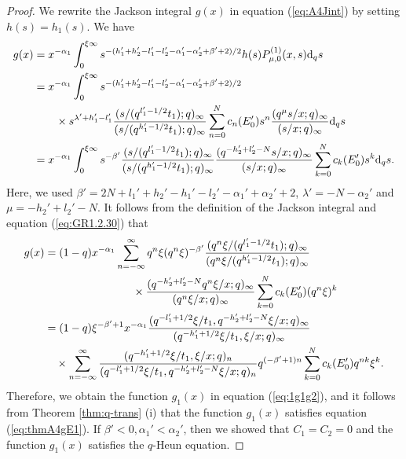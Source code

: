 \documentclass[12pt]{amsart}
\numberwithin{equation}{section}
\theoremstyle{definition}
\theoremstyle{remark}
\begin{document}
\begin{proof}
We rewrite the Jackson integral $g(x)$ in equation (\ref{eq:A4Jint}) by setting $h(s)=h_1(s)$.
We have
  \begin{align*}
  g(x) & = x^{-\alpha_{1}} \int_{0}^{\xi \infty} s^{-(h_{1}' + h_{2}' - l_{1}' - l_{2}' - \alpha_{1}' - \alpha_{2}' + \beta' + 2)/2} h(s) P_{\mu, 0}^{(1)} (x, s) {\rm{d}}_{q}s \\
    &= x^{-\alpha_{1}} \int_{0}^{\xi \infty} s^{-(h_{1}' + h_{2}' - l_{1}' - l_{2}' - \alpha_{1}' - \alpha_{2}' + \beta' + 2)/2} \\
    &\qquad \times s^{\lambda ' + h_{1}' - l_{1}'} \frac{(s/(q^{l_{1}' - 1/2}t_{1}); q)_\infty}{(s/(q^{h_{1}' - 1/2}t_{1}); q)_\infty} \sum_{n = 0}^{N} c_{n} (E_{0}') s^{n} \frac{(q^{\mu} s/x; q)_{\infty}}{( s/x; q)_{\infty}} {\rm{d}}_{q}s \\
    & = x^{-\alpha_{1}} \int_{0}^{\xi \infty} s^{-\beta'} \frac{(s/(q^{l_{1}' - 1/2}t_{1}); q)_\infty}{(s/(q^{h_{1}' - 1/2}t_{1}); q)_\infty} \frac{(q^{-h_{2}' + l_{2}' - N} s/x; q)_{\infty}}{(s/x; q)_{\infty}} \sum_{k = 0}^{N} c_{k} (E_{0}') s^{k} {\rm{d}}_{q}s .
  \end{align*}
Here, we used $\beta' = 2N + l_{1}' + h_{2}' - h_{1}' - l_{2}' - \alpha_{1}' + \alpha_{2}' + 2$, $\lambda ' = - N - \alpha_{2}'$ and $\mu = -h_{2}' + l_{2}' - N$.
It follows from the definition of the Jackson integral and equation (\ref{eq:GR1.2.30}) that
  \begin{align*}
    g(x) &= (1 - q) x^{-\alpha_{1}} \sum_{n = -\infty}^{\infty} q^{n}\xi (q^{n}\xi)^{-\beta'}\frac{(q^{n}\xi/(q^{l_{1}' - 1/2}t_{1}); q)_{\infty}}{(q^{n}\xi/(q^{h_{1}' - 1/2}t_{1}); q)_\infty} \\
    &\qquad \qquad \qquad \qquad \times \frac{(q^{-h_{2}' + l_{2}' - N} q^{n}\xi/x; q)_{\infty}}{(q^{n}\xi/x; q)_{\infty}} \sum_{k = 0}^{N} c_{k} (E_{0}') (q^{n}\xi)^{k} \\
 &= (1 - q)\xi^{-\beta' + 1}x^{-\alpha_{1}}\frac{(q^{-l_{1}' + 1/2}\xi/t_{1}, q^{-h_{2}' + l_{2}' - N}\xi/x; q)_{\infty}}{(q^{-h_{1}' + 1/2}\xi/t_{1}, \xi/x; q)_{\infty}} \notag \\
    &\quad \times \sum_{n = -\infty}^{\infty} \frac{(q^{-h_{1}' + 1/2}\xi/t_{1}, \xi/x; q)_{n}}{(q^{-l_{1}' + 1/2}\xi/t_{1}, q^{-h_{2}' + l_{2}' - N}\xi/x; q)_{n}} q^{(-\beta' + 1)n} \sum_{k = 0}^{N} c_{k} (E_{0}') q^{nk} \xi^{k} . \notag 
  \end{align*}
Therefore, we obtain the function $g_1 (x)$ in equation (\ref{eq:1g1g2}), and it follows from Theorem \ref{thm:q-trans} (i) that the function $g_1 (x)$ satisfies equation (\ref{eq:thmA4gE1}).
If $\beta' < 0, \alpha_{1}' < \alpha_{2}'$, then we showed that $C_1=C_2=0$ and the function $g_1 (x)$ satisfies the $q$-Heun equation.


\end{proof}
\end{document}
